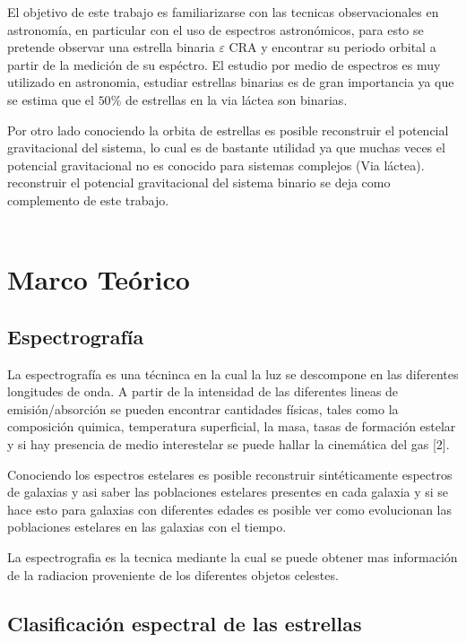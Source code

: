 \documentclass[Proceedings]{ascelike}
\begin{document}
El objetivo de este trabajo es familiarizarse con las tecnicas observacionales en astronom\'ia, en particular
con el uso de espectros astron\'omicos, para esto se pretende observar una estrella binaria $\varepsilon$ CRA 
y encontrar su periodo orbital a partir de la medici\'on de su esp\'ectro. El estudio por medio de espectros es muy utilizado en astronomia, estudiar estrellas binarias es de gran importancia ya que se estima que el $50\%$ de estrellas en la via l\'actea son binarias.  

Por otro lado conociendo la orbita de estrellas es posible reconstruir el potencial gravitacional 
del sistema, lo cual es de bastante utilidad ya que muchas veces el potencial gravitacional no es conocido para sistemas complejos (Via l\'actea). reconstruir el potencial gravitacional del sistema binario se deja como 
complemento de este trabajo.\\
\\

\section{Marco Te\'orico}

\subsection{Espectrograf\'ia}

La espectrograf\'ia es una t\'ecninca en la cual la luz se descompone en las diferentes
longitudes de onda. A partir de la intensidad de las diferentes lineas de emisi\'on/absorci\'on
se pueden encontrar cantidades f\'isicas, tales 
como la composici\'on quimica, temperatura superficial, la masa, tasas de formaci\'on estelar
 y si hay presencia de medio interestelar se puede hallar la cinem\'atica del gas [2].
 
Conociendo los espectros estelares es posible reconstruir sint\'eticamente espectros de galaxias
y asi saber las poblaciones estelares presentes en cada galaxia y si se hace esto para galaxias
con diferentes edades es posible ver como evolucionan las poblaciones estelares en las galaxias 
con el tiempo.

La espectrografia es la tecnica mediante la cual se puede obtener mas informaci\'on de la radiacion 
proveniente de los diferentes objetos celestes.

\subsection{Clasificaci\'on espectral de las estrellas}
\end{document}
